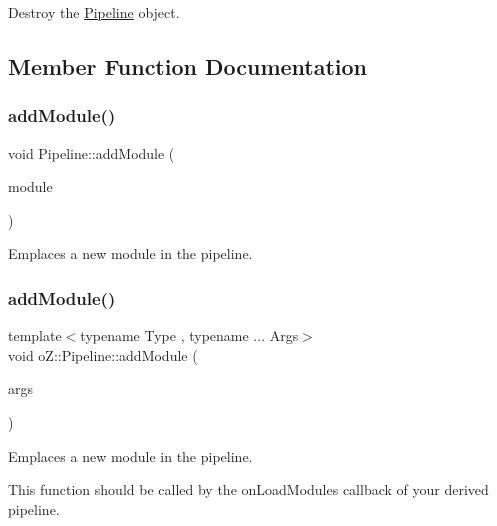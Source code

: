 Destroy the \mbox{\hyperlink{classo_z_1_1_pipeline}{Pipeline}} object. 



\subsection{Member Function Documentation}
\mbox{\label{classo_z_1_1_pipeline_aa96f1ef3faeb41c9966d6b5a103fa3a5}} 
\subsubsection{\texorpdfstring{addModule()}{addModule()}\hspace{0.1cm}{\footnotesize\ttfamily [1/2]}}
{\footnotesize\ttfamily void Pipeline\+::add\+Module (\begin{DoxyParamCaption}\item[{\mbox{\hyperlink{namespaceo_z_af5a56aaaee027504979038f38991adcf}{Module\+Ptr}} \&\&}]{module }\end{DoxyParamCaption})}



Emplaces a new module in the pipeline. 

\mbox{\label{classo_z_1_1_pipeline_a797f98947aace930fbb15cd6b2d9f726}} 
\subsubsection{\texorpdfstring{addModule()}{addModule()}\hspace{0.1cm}{\footnotesize\ttfamily [2/2]}}
{\footnotesize\ttfamily template$<$typename Type , typename ... Args$>$ \\
void o\+Z\+::\+Pipeline\+::add\+Module (\begin{DoxyParamCaption}\item[{Args \&\&...}]{args }\end{DoxyParamCaption})}



Emplaces a new module in the pipeline. 

This function should be called by the on\+Load\+Modules callback of your derived pipeline. \mbox{\label{classo_z_1_1_pipeline_aa8aa56af891b2d889e7c21198daa1451}} 
